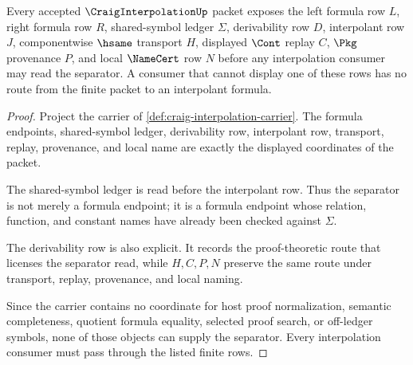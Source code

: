 \begin{theorem}
\label{thm:craig-interpolation-symbol-separation}
Every accepted $\CraigInterpolationUp$ packet exposes the left formula row $L$, right formula row $R$, shared-symbol ledger $\Sigma$, derivability row $D$, interpolant row $J$, componentwise $\hsame$ transport $H$, displayed $\Cont$ replay $C$, $\Pkg$ provenance $P$, and local $\NameCert$ row $N$ before any interpolation consumer may read the separator. A consumer that cannot display one of these rows has no route from the finite packet to an interpolant formula.
\end{theorem}
\begin{proof}
Project the carrier of \autoref{def:craig-interpolation-carrier}. The formula endpoints, shared-symbol ledger, derivability row, interpolant row, transport, replay, provenance, and local name are exactly the displayed coordinates of the packet.

The shared-symbol ledger is read before the interpolant row. Thus the separator is not merely a formula endpoint; it is a formula endpoint whose relation, function, and constant names have already been checked against $\Sigma$.

The derivability row is also explicit. It records the proof-theoretic route that licenses the separator read, while $H,C,P,N$ preserve the same route under transport, replay, provenance, and local naming.

Since the carrier contains no coordinate for host proof normalization, semantic completeness, quotient formula equality, selected proof search, or off-ledger symbols, none of those objects can supply the separator. Every interpolation consumer must pass through the listed finite rows.
\end{proof}




